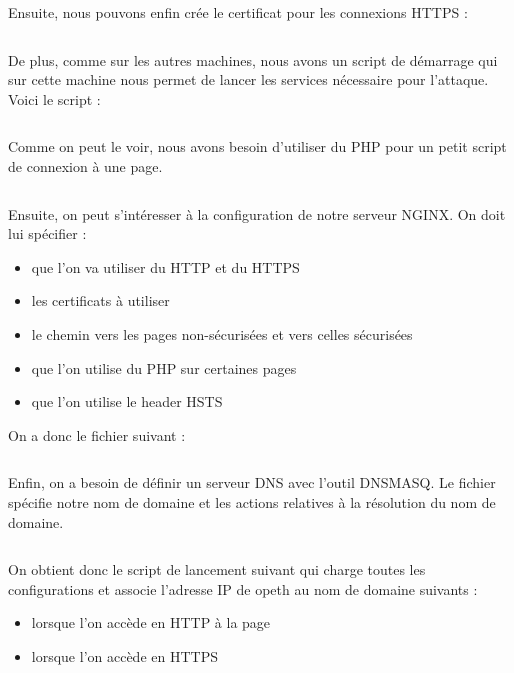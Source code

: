\inputminted[bgcolor=lbcolor, breaklines]{shell}{../CA/create-ca.sh}

Ensuite, nous pouvons enfin crée le certificat pour les connexions HTTPS :

\inputminted[bgcolor=lbcolor, breaklines]{shell}{../CA/new-cert.sh}

De plus, comme sur les autres machines, nous avons un script de démarrage qui sur cette machine nous permet de lancer les services nécessaire pour l'attaque. Voici le script :

\inputminted[bgcolor=lbcolor, breaklines]{shell}{../sslstrip2/opeth/start.sh}

Comme on peut le voir, nous avons besoin d'utiliser du PHP pour un petit script de connexion à une page.

\inputminted[bgcolor=lbcolor, breaklines]{shell}{../sslstrip2/opeth/php7.0-fpm.conf}

Ensuite, on peut s'intéresser à la configuration de notre serveur NGINX. On doit lui spécifier :

\begin{itemize}
\item que l'on va utiliser du HTTP et du HTTPS
\item les certificats à utiliser
\item le chemin vers les pages non-sécurisées et vers celles sécurisées
\item que l'on utilise du PHP sur certaines pages
\item que l'on utilise le header HSTS
\end{itemize}

On a donc le fichier suivant  :

\inputminted[bgcolor=lbcolor, breaklines]{shell}{../sslstrip2/opeth/nginx.conf}

Enfin, on a besoin de définir un serveur DNS avec l'outil DNSMASQ. Le fichier  spécifie notre nom de domaine et les actions relatives à la résolution du nom de domaine.

\inputminted[bgcolor=lbcolor, breaklines]{shell}{../sslstrip2/opeth/dnsmasq.conf}

On obtient donc le script de lancement suivant qui charge toutes les configurations et associe l'adresse IP de opeth au nom de domaine suivants :

\begin{itemize}
\item {} lorsque l'on accède en HTTP à la page
\item {} lorsque l'on accède en HTTPS
\end{itemize}

